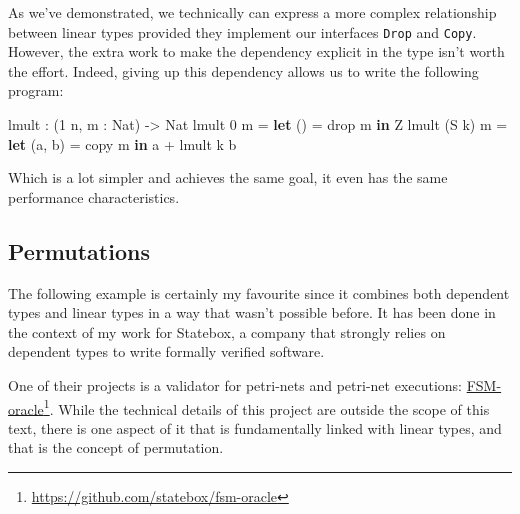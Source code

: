\documentclass[
]{article}
\newenvironment{Shaded}{}{}
\newcommand{\DataTypeTok}[1]{\textcolor[rgb]{0.56,0.13,0.00}{#1}}
\newcommand{\DecValTok}[1]{\textcolor[rgb]{0.25,0.63,0.44}{#1}}
\newcommand{\FunctionTok}[1]{\textcolor[rgb]{0.02,0.16,0.49}{#1}}
\newcommand{\KeywordTok}[1]{\textcolor[rgb]{0.00,0.44,0.13}{\textbf{#1}}}
\newcommand{\NormalTok}[1]{#1}
\newcommand{\OperatorTok}[1]{\textcolor[rgb]{0.40,0.40,0.40}{#1}}
\newcommand{\OtherTok}[1]{\textcolor[rgb]{0.00,0.44,0.13}{#1}}
\begin{document}
As we've demonstrated, we technically can express a more complex
relationship between linear types provided they implement our interfaces
\texttt{Drop} and \texttt{Copy}. However, the extra work to make the
dependency explicit in the type isn't worth the effort. Indeed, giving
up this dependency allows us to write the following program:

\begin{Shaded}
\begin{Highlighting}[]
\NormalTok{lmult }\OperatorTok{:}\NormalTok{ (}\DecValTok{1}\NormalTok{ n, m }\OperatorTok{:} \DataTypeTok{Nat}\NormalTok{) }\OtherTok{{-}\textgreater{}} \DataTypeTok{Nat}
\NormalTok{lmult }\DecValTok{0}\NormalTok{ m }\OtherTok{=} \KeywordTok{let}\NormalTok{ () }\OtherTok{=} \FunctionTok{drop}\NormalTok{ m }\KeywordTok{in} \DataTypeTok{Z}
\NormalTok{lmult (}\DataTypeTok{S}\NormalTok{ k) m }\OtherTok{=} \KeywordTok{let}\NormalTok{ (a, b) }\OtherTok{=}\NormalTok{ copy m }\KeywordTok{in}\NormalTok{ a }\OperatorTok{+}\NormalTok{ lmult k b}
\end{Highlighting}
\end{Shaded}

Which is a lot simpler and achieves the same goal, it even has the same
performance characteristics.

\hypertarget{permutations}{%
\subsection{Permutations}\label{permutations}}

The following example is certainly my favourite since it combines both
dependent types and linear types in a way that wasn't possible before.
It has been done in the context of my work for Statebox, a company that
strongly relies on dependent types to write formally verified software.

One of their projects is a validator for petri-nets\cite{petri-nets} and
petri-net executions:
\href{https://github.com/statebox/fsm-oracle}{FSM-oracle}\footnote{\url{https://github.com/statebox/fsm-oracle}}.
While the technical details of this project are outside the scope of
this text, there is one aspect of it that is fundamentally linked with
linear types, and that is the concept of permutation.
\end{document}
